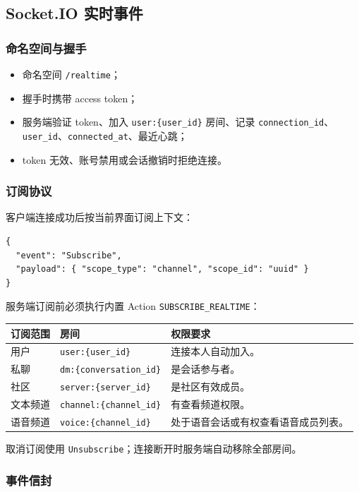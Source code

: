 \subsection{Socket.IO 实时事件}

\subsubsection{命名空间与握手}
\begin{itemize}
  \item 命名空间 \texttt{/realtime}；
  \item 握手时携带 access token；
  \item 服务端验证 token、加入 \texttt{user:\{user\_id\}} 房间、记录 \texttt{connection\_id}、\texttt{user\_id}、\texttt{connected\_at}、最近心跳；
  \item token 无效、账号禁用或会话撤销时拒绝连接。
\end{itemize}

\subsubsection{订阅协议}
客户端连接成功后按当前界面订阅上下文：

\begin{verbatim}
{
  "event": "Subscribe",
  "payload": { "scope_type": "channel", "scope_id": "uuid" }
}
\end{verbatim}

服务端订阅前必须执行内置 Action \texttt{SUBSCRIBE\_REALTIME}：

\noindent\begin{tabularx}{\textwidth}{L{2.4cm}L{4.4cm}Y}
  \toprule
  订阅范围 & 房间 & 权限要求 \\
  \midrule
  用户 & \texttt{user:\{user\_id\}} & 连接本人自动加入。 \\
  私聊 & \texttt{dm:\{conversation\_id\}} & 是会话参与者。 \\
  社区 & \texttt{server:\{server\_id\}} & 是社区有效成员。 \\
  文本频道 & \texttt{channel:\{channel\_id\}} & 有查看频道权限。 \\
  语音频道 & \texttt{voice:\{channel\_id\}} & 处于语音会话或有权查看语音成员列表。 \\
  \bottomrule
\end{tabularx}

取消订阅使用 \texttt{Unsubscribe}；连接断开时服务端自动移除全部房间。

\subsubsection{事件信封}

